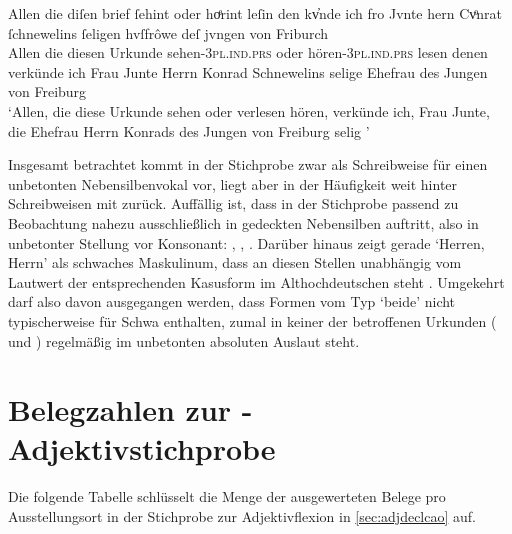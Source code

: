 \begin{exe}
\ex\label{ex:fribr_hoerint}
	\setlength{\glossglue}{5pt plus 2pt minus 2pt}
	\gll Allen die diſen brief ſehint oder hoͤrint leſin den kv̓nde ich fro
			Jvnte hern Cvͦnrat ſchnewelins ſeligen hvſfrôwe deſ jvngen von
			Friburch \textelp{} \\
		Allen die diesen Urkunde sehen-\textsc{3pl.ind.prs} oder
			hören-\textsc{3pl.ind.prs} lesen denen verkünde ich Frau Junte Herrn
			Konrad Schnewelins selige Ehefrau des Jungen von Freiburg \\
	\trans `Allen, die diese Urkunde sehen oder verlesen hören, verkünde
		ich, Frau Junte, die Ehefrau Herrn Konrads des Jungen von Freiburg
		selig \textelp{}'
		\parencites(Nr.~328, Freiburg i.\,Br., 1277)[314,33--34]{cao1}
\end{exe}

Insgesamt betrachtet kommt  in der Stichprobe zwar als Schreibweise für
einen unbetonten Nebensilbenvokal vor, liegt aber in der Häufigkeit weit hinter
Schreibweisen mit  zurück. Auffällig ist, dass  in der Stichprobe
passend zu  Beobachtung nahezu
ausschließlich in gedeckten Nebensilben auftritt, also in unbetonter Stellung
vor Konsonant: , , .
Darüber hinaus zeigt gerade  `Herren, Herrn' als schwaches
Maskulinum, dass  an diesen Stellen unabhängig vom Lautwert der
entsprechenden Kasusform im Althochdeutschen steht
\autocite[vgl.][282--283]{braune2018}. Umgekehrt darf also davon ausgegangen
werden, dass Formen vom Typ  `beide' nicht typischerweise
 für Schwa enthalten, zumal in keiner der betroffenen Urkunden
(\cites(Nrn.~81, 190)[124,18--33; 205,30--45]{cao1} und
\cites(Nr.~N~230)[175,1--33]{cao5}) regelmäßig  im unbetonten absoluten
Auslaut steht.

\section{Belegzahlen zur \CAO{}-Adjektivstichprobe}
\label{sec:caoadjquanttab}

Die folgende Tabelle schlüsselt die Menge der ausgewerteten Belege pro
Ausstellungsort in der Stichprobe zur Adjektivflexion in \cref{sec:adjdeclcao}
auf.


